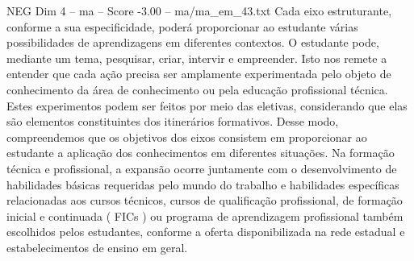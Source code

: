 \begin{textsample}{NEG Dim 4 – ma – Score -3.00 – ma/ma\_em\_43.txt}
Cada eixo estruturante, conforme a sua especificidade, poderá proporcionar ao estudante várias possibilidades de aprendizagens em diferentes contextos.
O estudante pode, mediante um tema, pesquisar, criar, intervir e empreender.
Isto nos remete a entender que cada ação precisa ser amplamente experimentada pelo objeto de conhecimento da área de conhecimento ou pela educação profissional técnica.
Estes experimentos podem ser feitos por meio das eletivas, considerando que elas são elementos constituintes dos itinerários formativos.
Desse modo, compreendemos que os objetivos dos eixos consistem em proporcionar ao estudante a aplicação dos conhecimentos em diferentes situações.
Na formação técnica e profissional, a expansão ocorre juntamente com o desenvolvimento de habilidades básicas requeridas pelo mundo do trabalho e habilidades específicas relacionadas aos cursos técnicos, cursos de qualificação profissional, de formação inicial e continuada ( FICs ) ou programa de aprendizagem profissional também escolhidos pelos estudantes, conforme a oferta disponibilizada na rede estadual e estabelecimentos de ensino em geral.

\end{textsample}
